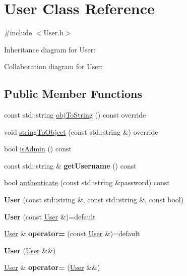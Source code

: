 \hypertarget{classUser}{}\section{User Class Reference}
\label{classUser}


{\ttfamily \#include $<$User.\+h$>$}



Inheritance diagram for User\+:


Collaboration diagram for User\+:
\subsection*{Public Member Functions}
\begin{DoxyCompactItemize}
\item 
const std\+::string \hyperlink{classUser_a941a44ea8fc61a10d918566e2afc7cbc}{obj\+To\+String} () const override
\item 
void \hyperlink{classUser_a45730ce65190e6bb9734b5d797484bf9}{string\+To\+Object} (const std\+::string \&) override
\item 
bool \hyperlink{classUser_a149f362a527d2d6024b15bd99e075f40}{is\+Admin} () const
\item 
\mbox{\label{classUser_a0bdca63ed72fc8ffcee690a0119c2104}} 
const std\+::string \& {\bfseries get\+Username} () const
\item 
bool \hyperlink{classUser_abc59adb4249ad4e6d521d118e6dc96e1}{authenticate} (const std\+::string \&password) const
\item 
\mbox{\label{classUser_a7b0371ee04e466f62615373e5ba9d6a2}} 
{\bfseries User} (const std\+::string \&, const std\+::string \&, const bool)
\item 
\mbox{\label{classUser_a3c20678fb9c65cdb1f27462a0d476303}} 
{\bfseries User} (const \hyperlink{classUser}{User} \&)=default
\item 
\mbox{\label{classUser_ab5d8fb981c60a7e335abfb12c91af27d}} 
\hyperlink{classUser}{User} \& {\bfseries operator=} (const \hyperlink{classUser}{User} \&)=default
\item 
\mbox{\label{classUser_a1609b007f5a8a12c08fbf13c72714dbb}} 
{\bfseries User} (\hyperlink{classUser}{User} \&\&)
\item 
\mbox{\label{classUser_a5f5dcae61b80f2a1a389fc12d990f0f8}} 
\hyperlink{classUser}{User} \& {\bfseries operator=} (\hyperlink{classUser}{User} \&\&)
\end{DoxyCompactItemize}
